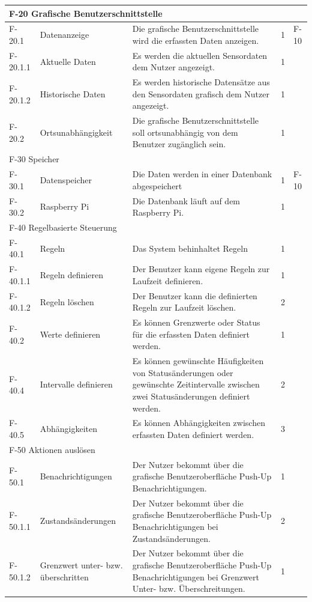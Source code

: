 \begin{tabularx}{\textwidth}{|l|X|X|l|l|}
	\hline
	\multicolumn{5}{|l|}{F-20 Grafische Benutzerschnittstelle}\\
	\hline
	F-20.1   & Datenanzeige & Die grafische Benutzerschnittstelle wird die erfassten Daten anzeigen. & 1 & F-10\\
	F-20.1.1 & Aktuelle Daten & Es werden die aktuellen Sensordaten dem Nutzer angezeigt. & 1 & \\
	F-20.1.2 & Historische Daten & Es werden historische Datensätze aus den Sensordaten grafisch dem Nutzer angezeigt. & 1 & \\
	F-20.2 & Ortsunabhängigkeit & Die grafische Benutzerschnittstelle soll ortsunabhängig von dem Benutzer zugänglich sein. & 1 & \\
	\hline
	\multicolumn{5}{|l|}{F-30 Speicher}\\
	\hline
	F-30.1 & Datenspeicher & Die Daten werden in einer Datenbank abgespeichert & 1 & F-10 \\
	F-30.2 & Raspberry Pi & Die Datenbank läuft auf dem Raspberry Pi. & 1 & \\
	\hline
	\multicolumn{5}{|l|}{F-40 Regelbasierte Steuerung}\\
	\hline
	F-40.1 & Regeln & Das System behinhaltet Regeln & 1 & \\
	F-40.1.1 & Regeln definieren & Der Benutzer kann eigene Regeln zur Laufzeit definieren. & 1 & \\
	F-40.1.2 & Regeln löschen & Der Benutzer kann die definierten Regeln zur Laufzeit löschen. & 2 & \\
	F-40.2 & Werte definieren & Es können Grenzwerte oder Status für die erfassten Daten definiert werden. & 1 & \\
	F-40.4 & Intervalle definieren & Es können gewünschte Häufigkeiten von Statusänderungen oder gewünschte Zeitintervalle zwischen zwei Statusänderungen definiert werden. & 2 & \\
	F-40.5 & Abhängigkeiten & Es können Abhängigkeiten zwischen erfassten Daten definiert werden. & 3 & \\
	\hline
	\multicolumn{5}{|l|}{F-50 Aktionen auslösen}\\
	\hline
	F-50.1 & Benachrichtigungen & Der Nutzer bekommt über die grafische Benutzeroberfläche Push-Up Benachrichtigungen. & 1 & \\
	F-50.1.1 & Zustandsänderungen & Der Nutzer bekommt über die grafische Benutzeroberfläche Push-Up Benachrichtigungen bei Zustandsänderungen. & 2 & \\
	F-50.1.2 & Grenzwert unter- bzw. überschritten & Der Nutzer bekommt über die grafische Benutzeroberfläche Push-Up Benachrichtigungen bei Grenzwert Unter- bzw. Überschreitungen. & 1 & \\

\end{tabularx}
